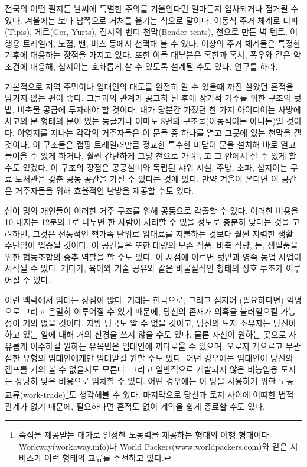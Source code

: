 \documentclass[10pt, b6paper, openany]{memoir}
\begin{document}
\begin{article}
전국의 어떤 필지든 날씨에 특별한 주의를 기울인다면 얼마든지 임차되거나 점거될 수 있다.  겨울에는 보다 남쪽으로 거처를 옮기는 식으로 말이다. 이동식 주거 체계로 티피(Tipis), 게르(Ger, Yurts), 집시의 벤더 천막(Bender tents), 천으로 만든 벽 텐트, 여행용 트레일러, 노점, 밴, 버스 등에서 선택해 볼 수 있다. 이상의 주거 체계들은 특정한 기후에 대응하는 장점을 가지고 있다. 또한 이들 대부분은 혹한과 혹서, 폭우와 같은 악조건에 대응해, 심지어는 호화롭게 살 수 있도록 설계될 수도 있다. 연구를 하라. 

기본적으로 지역 주민이나 임대인의 태도를 완전히 알 수 있을때 까진 살았던 흔적을 남기지 않는 편이 좋다. 그들과의  관계가 공고히 된 후에 장기적 거주를 위한 구조와 텃밭, 비축물 공급에 투자해야 할 것이다. 내가 당분간 가졌던 한 가지 아이디어는 사방에 차고의 문 형태의 문이 있는 둥글거나 아마도 8면의 구조물(이동식이든 아니든)일 것이다. 야영지를 지나는 각각의 거주자들은 이 문들 중 하나를 열고 그곳에 있는 천막을 갤 것이다. 이 구조물은 캠핑 트레일러만큼 정교한 특수한 미닫이 문을 설치해 바로 열고 들어올 수 있게 하거나, 훨씬 간단하게 그냥 천으로 가려두고 그 안에서 잘 수 있게 할 수도 있겠다. 이 구조의 장점은 공공설비와 독립된 샤워 시설, 주방, 소파, 심지어는 무료 도서관을 갖춘 공동 공간을 가질 수 있다는 것에 있다. 만약 겨울이 온다면 이 공간은 거주자들을 위해 효율적인 난방을 제공할 수도 있다.

십여 명의 개인들이 이러한 거주 구조를 위해 공동으로 각출할 수 있다. 이러한 비용을 10 내지는 12분의 1로 나누면 한 사람이 처리할 수 있을 정도로 충분히 낮다는 것을 고려하면, 그것은 전통적인 핵가족 단위로 임대료를 지불하는 것보다 훨씬 저렴한 생활 수단임이 입증될 것이다. 이 공간들은 또한 대량의 보존 식품, 비축 식량, 돈, 생필품을 위한 협동조합의 중추 역할을 할 수도 있다. 이 시점에 이르면 텃밭과 영속 농업 사업이 시작될 수 있다. 게다가, 육아와 기술 공유와 같은 비물질적인 형태의 상호 부조가 이루어질 수 있다. 

이런 맥락에서 임대는 장점이 많다. 거래는 현금으로, 그리고 심지어 (필요하다면) 익명으로 그리고 은밀히 이루어질 수 있기 때문에, 당신의 존재가 의혹을 불러일으킬 가능성이 거의 없을 것이다. 지방 당국도 알 수 없을 것이고, 당신의 토지 소유자는 당신이 하고 있는 일에 대해 거의 신경을 쓰지 않을 수도 있다. 물론 자신이 원하는 곳으로 자유롭게 이주하길 원하는 유목민은 임대인에 까다로울 수 있으며, 오로지 게으르고 무관심한 유형의 임대인에게만 임대받길 원할 수도 있다. 어떤 경우에는 임대인이 당신의 캠프를 거의 볼 수 없을지도 모른다. 그리고 일반적으로 개발되지 않은 비농업용 토지는 상당히 낮은 비용으로 임차할 수 있다. 어떤 경우에는 이 땅을 사용하기 위한 노동 교류(work-trade)\footnote{숙식을 제공받는 대가로 일정한 노동력을 제공하는 형태의 여행 형태이다. Workway(workaway.info)나 World Packers(www.worldpackers.com)와 같은 서비스가 이런 형태의 교류를 주선하고 있다.}도 생각해볼 수 있다. 마지막으로 당신과 토지 사이에 어떠한 법적 관계가 없기 때문에, 필요하다면 흔적도 없이 계약을 쉽게 종료할 수도 있다. 


\end{article}
\end{document}
